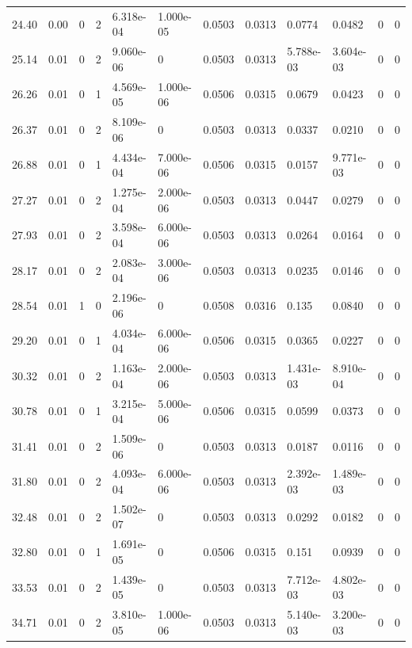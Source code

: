 \documentclass[preview]{standalone}
\begin{document}
{{{\begin{tabular}{L{1.2cm}C{1.2cm} C{0.3cm}C{0.5cm} C{1.4cm}C{1.4cm} C{1.4cm}C{1.4cm} C{1.6cm}C{1.6cm} C{1.6cm}C{1.6cm}}
  24.40  &  0.00  & 0     &  2 &  6.318e-04  & 1.000e-05  &  0.0503&   0.0313& 0.0774 & 0.0482   &  0 & 0  \\ 
  25.14  &  0.01  & 0     &  2 &  9.060e-06  & 0  &  0.0503&   0.0313& 5.788e-03 & 3.604e-03   &  0 & 0  \\ 
  26.26  &  0.01  & 0     &  1 &  4.569e-05  & 1.000e-06  &  0.0506&   0.0315& 0.0679 & 0.0423   &  0 & 0  \\ 
  26.37  &  0.01  & 0     &  2 &  8.109e-06  & 0  &  0.0503&   0.0313& 0.0337 & 0.0210   &  0 & 0  \\ 
  26.88  &  0.01  & 0     &  1 &  4.434e-04  & 7.000e-06  &  0.0506&   0.0315& 0.0157 & 9.771e-03   &  0 & 0  \\ 
  27.27  &  0.01  & 0     &  2 &  1.275e-04  & 2.000e-06  &  0.0503&   0.0313& 0.0447 & 0.0279   &  0 & 0  \\ 
  27.93  &  0.01  & 0     &  2 &  3.598e-04  & 6.000e-06  &  0.0503&   0.0313& 0.0264 & 0.0164   &  0 & 0  \\ 
  28.17  &  0.01  & 0     &  2 &  2.083e-04  & 3.000e-06  &  0.0503&   0.0313& 0.0235 & 0.0146   &  0 & 0  \\ 
  28.54  &  0.01  & 1     &  0 &  2.196e-06  & 0  &  0.0508&   0.0316& 0.135 & 0.0840   &  0 & 0  \\ 
  29.20  &  0.01  & 0     &  1 &  4.034e-04  & 6.000e-06  &  0.0506&   0.0315& 0.0365 & 0.0227   &  0 & 0  \\ 
  30.32  &  0.01  & 0     &  2 &  1.163e-04  & 2.000e-06  &  0.0503&   0.0313& 1.431e-03 & 8.910e-04   &  0 & 0  \\ 
  30.78  &  0.01  & 0     &  1 &  3.215e-04  & 5.000e-06  &  0.0506&   0.0315& 0.0599 & 0.0373   &  0 & 0  \\ 
  31.41  &  0.01  & 0     &  2 &  1.509e-06  & 0  &  0.0503&   0.0313& 0.0187 & 0.0116   &  0 & 0  \\ 
  31.80  &  0.01  & 0     &  2 &  4.093e-04  & 6.000e-06  &  0.0503&   0.0313& 2.392e-03 & 1.489e-03   &  0 & 0  \\ 
  32.48  &  0.01  & 0     &  2 &  1.502e-07  & 0  &  0.0503&   0.0313& 0.0292 & 0.0182   &  0 & 0  \\ 
  32.80  &  0.01  & 0     &  1 &  1.691e-05  & 0  &  0.0506&   0.0315& 0.151 & 0.0939   &  0 & 0  \\ 
  33.53  &  0.01  & 0     &  2 &  1.439e-05  & 0  &  0.0503&   0.0313& 7.712e-03 & 4.802e-03   &  0 & 0  \\ 
  34.71  &  0.01  & 0     &  2 &  3.810e-05  & 1.000e-06  &  0.0503&   0.0313& 5.140e-03 & 3.200e-03   &  0 & 0  \\ 

\end{tabular}}}}
\end{document}
